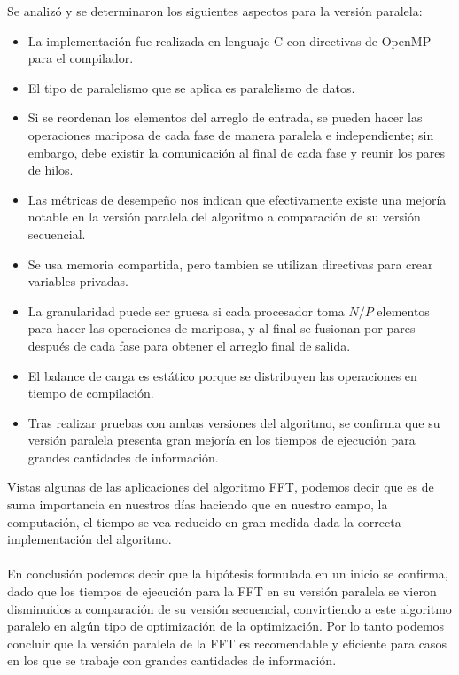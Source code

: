 \documentclass{article}
\begin{document}
Se analizó y se determinaron los siguientes aspectos para la versión paralela:
\begin{itemize}
    \item La implementación fue realizada en lenguaje C con directivas de OpenMP para el compilador.
    \item El tipo de paralelismo que se aplica es paralelismo de datos.
    \item Si se reordenan los elementos del arreglo de entrada, se pueden hacer las operaciones mariposa de cada fase de manera paralela e independiente; sin embargo, debe existir la comunicación al final de cada fase y reunir los pares de hilos.
    \item Las métricas de desempeño nos indican que efectivamente existe una mejoría notable en la versión paralela del algoritmo a comparación de su versión secuencial.
    \item Se usa memoria compartida, pero tambien se utilizan directivas para crear variables privadas.
    \item La granularidad puede ser gruesa si cada procesador toma $N/P$ elementos para hacer las operaciones de mariposa, y al final se fusionan por pares después de cada fase para obtener el arreglo final de salida.
    \item El balance de carga es estático porque se distribuyen las operaciones en tiempo de compilación.
    \item Tras realizar pruebas con ambas versiones del algoritmo, se confirma que su versión paralela presenta gran mejoría en los tiempos de ejecución para grandes cantidades de información. 
\end{itemize}

Vistas algunas de las aplicaciones del algoritmo FFT, podemos decir que es de suma importancia en nuestros días haciendo que en nuestro campo, la computación, el tiempo se vea reducido en gran medida dada la correcta implementación del algoritmo. \\ \\

En conclusión podemos decir que la hipótesis formulada en un inicio se confirma, dado que los tiempos de ejecución para la FFT en su versión paralela se vieron disminuidos a comparación de su versión secuencial, convirtiendo a este algoritmo paralelo en algún tipo de optimización de la optimización. Por lo tanto podemos concluir que la versión paralela de la FFT es recomendable y eficiente para casos en los que se trabaje con grandes cantidades de información. 
\newpage
\end{document}
